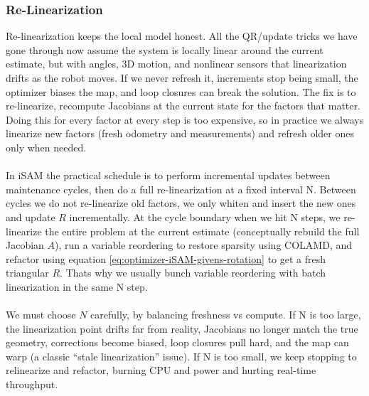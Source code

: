\subsubsection{Re-Linearization}
Re-linearization keeps the local model honest. All the QR/update tricks we have gone through now assume the system is locally linear around the current estimate, but with angles, 3D motion, and nonlinear sensors that linearization drifts as the robot moves. If we never refresh it, increments stop being small, the optimizer biases the map, and loop closures can break the solution. The fix is to re-linearize, recompute Jacobians at the current state for the factors that matter. Doing this for every factor at every step is too expensive, so in practice we always linearize new factors (fresh odometry and measurements) and refresh older ones only when needed.
\\ \\
In iSAM the practical schedule is to perform incremental updates between maintenance cycles, then do a full re-linearization at a fixed interval N. Between cycles we do not re-linearize old factors, we only whiten and insert the new ones and update $R$ incrementally. At the cycle boundary when we hit N steps, we re-linearize the entire problem at the current estimate (conceptually rebuild the full Jacobian $A$), run a variable reordering to restore sparsity using \gls{COLAMD}, and refactor using equation \eqref{eq:optimizer-iSAM-givens-rotation} to get a fresh triangular $R$. Thats why we usually bunch variable reordering with batch linearization in the same N step. 
\\ \\
We must choose $N$ carefully, by balancing freshness vs compute. If N is too large, the linearization point drifts far from reality, Jacobians no longer match the true geometry, corrections become biased, loop closures pull hard, and the map can warp (a classic ``stale linearization'' issue). If N is too small, we keep stopping to relinearize and refactor, burning CPU and power and hurting real-time throughput.



